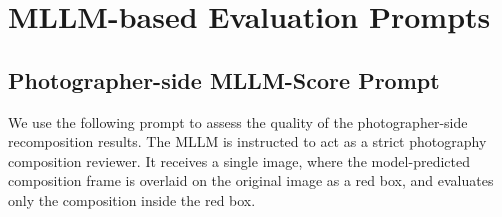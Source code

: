 \documentclass{llmxive}
\begin{document}
\section{MLLM-based Evaluation Prompts}
\label{app:evaluation_prompts}
\subsection{Photographer-side MLLM-Score Prompt}
\label{app:photographer_mllm_score_prompt}

We use the following prompt to assess the quality of the photographer-side recomposition results. The MLLM is instructed to act as a strict photography composition reviewer. It receives a single image, where the model-predicted composition frame is overlaid on the original image as a red box, and evaluates only the composition inside the red box.
\end{document}
